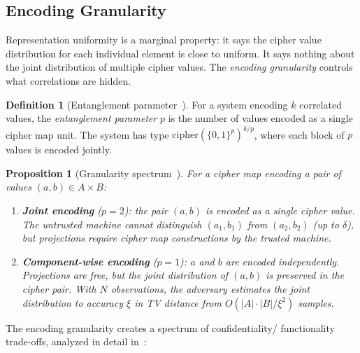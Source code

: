 \documentclass[conference]{IEEEtran}
\theoremstyle{definition}
\newtheorem{definition}{Definition}[section]
\theoremstyle{plain}
\newtheorem{proposition}[theorem]{Proposition}
\theoremstyle{remark}
\newcommand{\B}{\{0,1\}}
\begin{document}
\subsection{Encoding Granularity}
\label{subsec:granularity}

Representation uniformity is a marginal property: it says the cipher
value distribution for each individual element is close to uniform.  It
says nothing about the joint distribution of multiple cipher
values.  The \emph{encoding granularity} controls what correlations are
hidden.

\begin{definition}[Entanglement parameter~{\cite[Sec.~8]{towell2026cipher}}]
For a system encoding $k$ correlated values, the \emph{entanglement
parameter} $p$ is the number of values encoded as a single cipher map
unit.  The system has type $\mathrm{cipher}(\B^p)^{k/p}$, where each
block of $p$ values is encoded jointly.
\end{definition}

\begin{proposition}[Granularity spectrum~{\cite[Prop.~8.1]{towell2026cipher}}]
\label{prop:granularity}
For a cipher map encoding a pair of values $(a, b) \in A \times B$:
\begin{enumerate}
\item \textbf{Joint encoding} ($p = 2$): the pair $(a, b)$ is encoded as
  a single cipher value.  The untrusted machine cannot distinguish
  $(a_1, b_1)$ from $(a_2, b_2)$ (up to $\delta$), but projections
  require cipher map constructions by the trusted machine.

\item \textbf{Component-wise encoding} ($p = 1$): $a$ and $b$ are
  encoded independently.  Projections are free, but the joint distribution
  of $(a, b)$ is preserved in the cipher pair.  With $N$ observations, the
  adversary estimates the joint distribution to accuracy $\xi$ in TV
  distance from $O(|A| \cdot |B| / \xi^2)$ samples.
\end{enumerate}
\end{proposition}

The encoding granularity creates a spectrum of confidentiality/
functionality trade-offs, analyzed in detail
in~\cite{towell2026algebraic}:

\begin{center}
\end{center}
\end{document}
